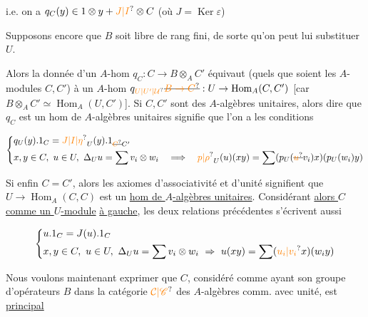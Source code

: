 i.e. on a $q_C(y)\in1\otimes y+\unsure{J|I}\otimes C$ (où $J=\operatorname{Ker}\varepsilon$)

Supposons encore que $B$ soit libre de rang fini, de sorte qu'on peut lui substituer $U$.

Alors la donnée d'un $A$-hom $q_C:C\to B\otimes_A C'$ équivaut (quels que soient les $A$-modules $C,C'$) à un $A$-hom $q_{\unsure{U|U'|\mathcal{U}}}\deleted{\unsure{B\to C}}:U\to\operatorname{Hom}_A(C,C')$ [car $B\otimes_A C'\simeq\operatorname{Hom}_A(U,C')$]. Si $C,C'$ sont des $A$-algèbres unitaires, alors dire que $q_C$ est un hom de $A$-algèbres unitaires signifie que l'on a les conditions


\[
\left\{\begin{aligned}
&q_U(y).1_C=\unsure{J|I|\eta}_U(y).1_{\deleted{\unsure{C}}C'}\\
&x,y\in C,\ u\in U,\ \Delta_U u=\sum v_i\otimes w_i\quad\Longrightarrow\quad
\unsure{p|\rho}_U(u)(xy)=\sum(p_U(\deleted{\unsure{u}}v_i)x)(p_U(w_i)y)
\end{aligned}\right.
\]

Si enfin $C=C'$, alors les  axiomes d'associativité et d'unité signifient que  $U\to\operatorname{Hom}_A(C,C)$ est un \uline{hom de $A$-algèbres unitaires}. Considérant \uline{alors $C$ comme un $U$-module}  \uline{à gauche}, les deux relations précédentes s'écrivent aussi

\[
\left\{\begin{aligned}
&u.1_C=J(u).1_C\\
&x,y\in C,\ u\in U,\ \Delta_U u=\sum v_i\otimes w_i\ \Rightarrow\
u(xy)=\sum(\unsure{u_i|v_i}x)(w_i y)
\end{aligned}\right.
\]

Nous voulons maintenant exprimer que $C$, considéré comme ayant son groupe d'opérateurs $B$ dans la catégorie $\unsure{\mathcal{C}|\mathscr{C}}$ des $A$-algèbres comm. avec unité, est   \uline{principal}   

\diagram{\begin{tikzcd}[ampersand replacement=\&]
\deleted{C\otimes_A C}\& \deleted{B}\arrow[l,draw=none,"{\deleted{\longleftarrow}}" description]
\end{tikzcd}}

